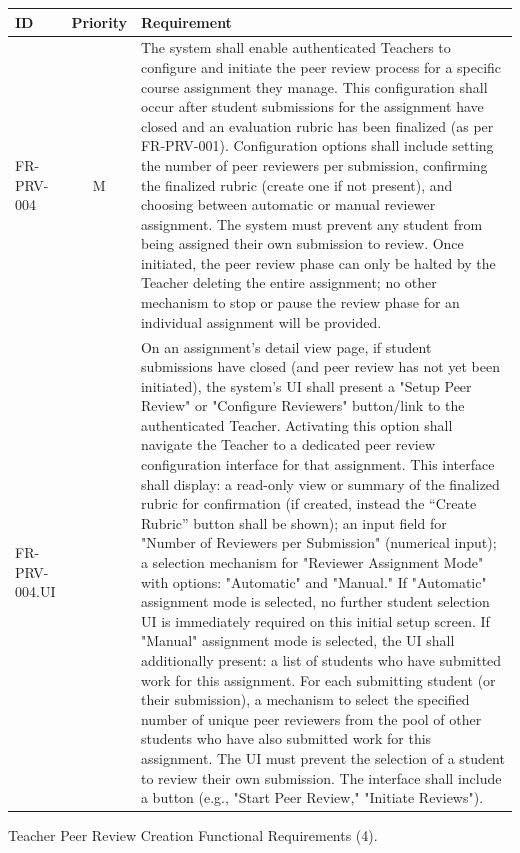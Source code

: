 \clearpage

\begin{longtable}{|l|c|p{10cm}|}
    \hline
    \textbf{ID} & \textbf{Priority} & \textbf{Requirement} \\
    \hline
    FR-PRV-004 & M & The system shall enable authenticated Teachers to configure and initiate the peer review process for a specific course assignment they manage. This configuration shall occur after student submissions for the assignment have closed and an evaluation rubric has been finalized (as per FR-PRV-001). Configuration options shall include setting the number of peer reviewers per submission, confirming the finalized rubric (create one if not present), and choosing between automatic or manual reviewer assignment. The system must prevent any student from being assigned their own submission to review. Once initiated, the peer review phase can only be halted by the Teacher deleting the entire assignment; no other mechanism to stop or pause the review phase for an individual assignment will be provided. \\
    \quad FR-PRV-004.UI &  & \quad On an assignment's detail view page, if student submissions have closed (and peer review has not yet been initiated), the system's UI shall present a "Setup Peer Review" or "Configure Reviewers" button/link to the authenticated Teacher. Activating this option shall navigate the Teacher to a dedicated peer review configuration interface for that assignment. This interface shall display: a read-only view or summary of the finalized rubric for confirmation (if created, instead the “Create Rubric” button shall be shown); an input field for "Number of Reviewers per Submission" (numerical input); a selection mechanism for "Reviewer Assignment Mode" with options: "Automatic" and "Manual." If "Automatic" assignment mode is selected, no further student selection UI is immediately required on this initial setup screen. If "Manual" assignment mode is selected, the UI shall additionally present: a list of students who have submitted work for this assignment. For each submitting student (or their submission), a mechanism to select the specified number of unique peer reviewers from the pool of other students who have also submitted work for this assignment. The UI must prevent the selection of a student to review their own submission. The interface shall include a button (e.g., "Start Peer Review," "Initiate Reviews"). 
   \hline
\end{longtable}

\begin{table}[h]
    \centering
    \caption{Teacher Peer Review Creation Functional Requirements (4).}
    \label{tab:TeacherPeerReviewFR4}
\end{table}

